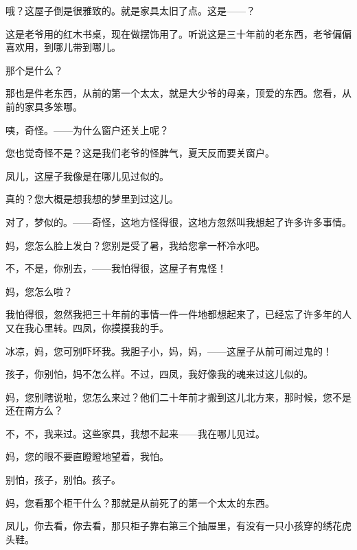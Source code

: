 哦？这屋子倒是很雅致的。就是家具太旧了点。这是——？

这是老爷用的红木书桌，现在做摆饰用了。听说这是三十年前的老东西，老爷偏偏喜欢用，到哪儿带到哪儿。

那个是什么？

那也是件老东西，从前的第一个太太，就是大少爷的母亲，顶爱的东西。您看，从前的家具多笨哪。

咦，奇怪。——为什么窗户还关上呢？

您也觉奇怪不是？这是我们老爷的怪脾气，夏天反而要关窗户。

凤儿，这屋子我像是在哪儿见过似的。

真的？您大概是想我想的梦里到过这儿。

对了，梦似的。——奇怪，这地方怪得很，这地方忽然叫我想起了许多许多事情。

妈，您怎么脸上发白？您别是受了暑，我给您拿一杯冷水吧。

不，不是，你别去，——我怕得很，这屋子有鬼怪！

妈，您怎么啦？

我怕得很，忽然我把三十年前的事情一件一件地都想起来了，已经忘了许多年的人又在我心里转。四凤，你摸摸我的手。

冰凉，妈，您可别吓坏我。我胆子小，妈，妈，——这屋子从前可闹过鬼的！

孩子，你别怕，妈不怎么样。不过，四凤，我好像我的魂来过这儿似的。

妈，您别瞎说啦，您怎么来过？他们二十年前才搬到这儿北方来，那时候，您不是还在南方么？

不，不，我来过。这些家具，我想不起来——我在哪儿见过。

妈，您的眼不要直瞪瞪地望着，我怕。

别怕，孩子，别怕。孩子。

妈，您看那个柜干什么？那就是从前死了的第一个太太的东西。

凤儿，你去看，你去看，那只柜子靠右第三个抽屉里，有没有一只小孩穿的绣花虎头鞋。

